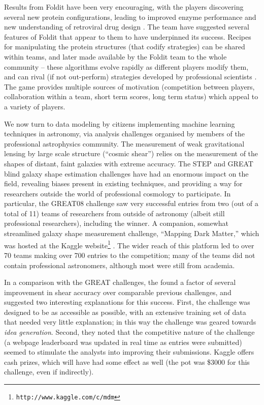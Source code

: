 \documentclass{ar2e}
\def\CaseStudy#1{\noindent{\it\bf #1 \,\,\,\,}}
\def\url#1{\texttt{#1}}
\begin{document}
Results from Foldit have been very encouraging, with the players discovering
several new protein configurations, leading to improved enzyme performance 
\citep{Eiben++2012} and new understanding of retroviral drug design
\citep{Khatib++2011a}. The team have suggested several features of Foldit that
appear to them to have underpinned its success. Recipes for manipulating the
protein structures (that codify strategies) can be shared within teams, and
later made available by the Foldit team to the whole community -- these
algorithms evolve rapidly as different players modify them, and can rival (if
not out-perform) strategies developed by professional scientists 
\citep{Khatib++2011b}. The game provides multiple sources of motivation
(competition between players, collaboration within a team, short term scores,
long term status) which appeal to a variety of players. 



\CaseStudy{Online Data Challenges}
We now turn to data modeling by citizens implementing machine learning
techniques in astronomy, via analysis challenges organised by members of the
professional astrophysics community. The measurement of weak gravitational
lensing by large scale structure (``cosmic shear'') relies on the measurement of
the shapes of distant, faint galaxies with extreme accuracy. The STEP
\citep{HeymansEtal2006,MasseyEtal2007} and GREAT
\citep{BridleEtal2010,KitchingEtal2012,KitchingEtal2013a} blind galaxy shape
estimation challenges have had an enormous impact on the field, revealing biases
present in existing techniques, and providing a way for researchers outside the
world of professional cosmology to participate. In particular, the GREAT08
challenge saw very successful entries from two (out of a total of 11) teams of
researchers from outside of astronomy (albeit still professional researchers),
including the winner. A companion, somewhat streamlined galaxy shape measurement
challenge, ``Mapping Dark Matter,'' which was hosted at the Kaggle
website\footnote{\url{http://www.kaggle.com/c/mdm}} \citep{KitchingEtal2013b}.
The wider reach of this platform led to over 70 teams making over 700 entries to
the competition; many of the teams did not contain professional astronomers,
although most were still from academia.

In a comparison with the GREAT challenges, the \citeauthor{KitchingEtal2013b}
found a factor of several improvement in shear accuracy over comparable previous
challenges, and suggested two interesting explanations for this success. First,
the challenge was designed to be as accessible as possible, with an extensive
training set of data that needed very little explanation; in this way the
challenge was geared towards {\it idea generation}. Second, they noted that the
competitive  nature of the challenge (a webpage leaderboard was updated in real
time as entries were submitted) seemed to stimulate the analysts into improving
their submissions. Kaggle offers cash prizes, which will have had some effect as
well (the pot was \$3000 for this challenge, even if indirectly).
\end{document}
